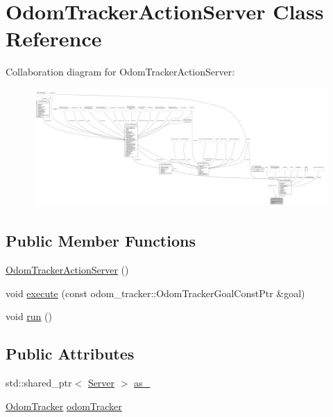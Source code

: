 \hypertarget{classOdomTrackerActionServer}{}\section{Odom\+Tracker\+Action\+Server Class Reference}
\label{classOdomTrackerActionServer}


Collaboration diagram for Odom\+Tracker\+Action\+Server\+:
\nopagebreak
\begin{figure}[H]
\begin{center}
\leavevmode
\includegraphics[width=350pt]{classOdomTrackerActionServer__coll__graph}
\end{center}
\end{figure}
\subsection*{Public Member Functions}
\begin{DoxyCompactItemize}
\item 
\hyperlink{classOdomTrackerActionServer_a98b7fba6da04e1afcf1000f937be7fef}{Odom\+Tracker\+Action\+Server} ()
\item 
void \hyperlink{classOdomTrackerActionServer_a97e470cdb4e4ae96e791d383583d9476}{execute} (const odom\+\_\+tracker\+::\+Odom\+Tracker\+Goal\+Const\+Ptr \&goal)
\item 
void \hyperlink{classOdomTrackerActionServer_a8ab6984c7383949a048d72437e9f79d3}{run} ()
\end{DoxyCompactItemize}
\subsection*{Public Attributes}
\begin{DoxyCompactItemize}
\item 
std\+::shared\+\_\+ptr$<$ \hyperlink{odom__tracker__node_8cpp_a9884574d0480319430f628f79afc0500}{Server} $>$ \hyperlink{classOdomTrackerActionServer_a28bed1d95003d837b2b47053dbc66878}{as\+\_\+}
\item 
\hyperlink{classodom__tracker_1_1OdomTracker}{Odom\+Tracker} \hyperlink{classOdomTrackerActionServer_a3e5c4328d3206fbd2fd2708f0aefe651}{odom\+Tracker}
\end{DoxyCompactItemize}



